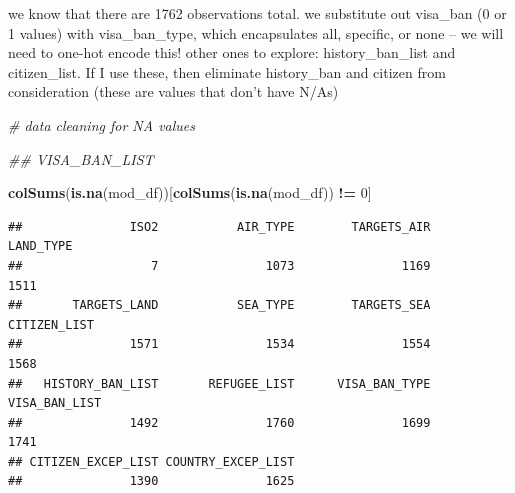 \documentclass[]{article}
\newenvironment{Shaded}{\begin{snugshade}}{\end{snugshade}}
\newcommand{\CommentTok}[1]{\textcolor[rgb]{0.56,0.35,0.01}{\textit{#1}}}
\newcommand{\DecValTok}[1]{\textcolor[rgb]{0.00,0.00,0.81}{#1}}
\newcommand{\KeywordTok}[1]{\textcolor[rgb]{0.13,0.29,0.53}{\textbf{#1}}}
\newcommand{\NormalTok}[1]{#1}
\newcommand{\OperatorTok}[1]{\textcolor[rgb]{0.81,0.36,0.00}{\textbf{#1}}}
\newcommand{\StringTok}[1]{\textcolor[rgb]{0.31,0.60,0.02}{#1}}
\begin{document}
we know that there are 1762 observations total. we substitute out
visa\_ban (0 or 1 values) with visa\_ban\_type, which encapsulates all,
specific, or none -- we will need to one-hot encode this! other ones to
explore: history\_ban\_list and citizen\_list. If I use these, then
eliminate history\_ban and citizen from consideration (these are values
that don't have N/As)

\begin{Shaded}
\begin{Highlighting}[]
\CommentTok{# data cleaning for NA values}

\CommentTok{## VISA_BAN_LIST}

\KeywordTok{colSums}\NormalTok{(}\KeywordTok{is.na}\NormalTok{(mod_df))[}\KeywordTok{colSums}\NormalTok{(}\KeywordTok{is.na}\NormalTok{(mod_df)) }\OperatorTok{!=}\StringTok{ }\DecValTok{0}\NormalTok{]}
\end{Highlighting}
\end{Shaded}

\begin{verbatim}
##               ISO2           AIR_TYPE        TARGETS_AIR          LAND_TYPE 
##                  7               1073               1169               1511 
##       TARGETS_LAND           SEA_TYPE        TARGETS_SEA       CITIZEN_LIST 
##               1571               1534               1554               1568 
##   HISTORY_BAN_LIST       REFUGEE_LIST      VISA_BAN_TYPE      VISA_BAN_LIST 
##               1492               1760               1699               1741 
## CITIZEN_EXCEP_LIST COUNTRY_EXCEP_LIST 
##               1390               1625
\end{verbatim}
\end{document}
